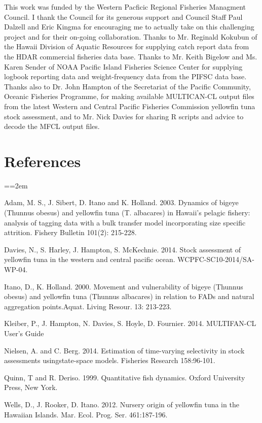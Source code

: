 \documentclass[12pt,letterpaper]{article}
\newcommand\doublespacing{\baselineskip=1.6\normalbaselineskip}
\begin{document}
\vspace{4ex}
This work was funded by the Western Pacficic Regional Fisheries
Managment Council. I thank the Council for its generous support and
Council Staff Paul Dalzell and Eric Kingma for encouraging me to
actually take on this challenging project and for their on-going
collaboration.
Thanks to Mr. Reginald Kokubun of the Hawaii Division of Aquatic
Resources for supplying catch report data from the HDAR commercial
fisheries data base.
Thanks to Mr. Keith Bigelow and Ms. Karen Sender of NOAA Pacific
Island Fisheries Science Center for supplying logbook reporting data and
weight-frequency data from the PIFSC data base.
Thanks also to Dr. John Hampton of the Secretariat of the Pacific
Community, Oceanic Fisheries Programme, for making available
MULTICAN-CL output files from the latest Western and Central Pacific
Fisheries Commission yellowfin tuna stock assessment, and to Mr. Nick
Davies for sharing R scripts and advice to decode the MFCL output files.

\section*{References}
{\parindent=0cm \small
\everypar={\hangindent=2em }\par
\doublespacing
Adam, M. S., J. Sibert, D. Itano and K. Holland. 2003. Dynamics of
bigeye (Thunnus obesus) and yellowfin tuna (T. albacares) in Hawaii's
pelagic fishery: analysis of tagging data with a bulk transfer model
incorporating size specific attrition. Fishery Bulletin 101(2):
215-228.

Davies, N., S. Harley, J. Hampton, S. McKechnie. 2014. Stock
assessment of yellowfin tuna in the western and central pacific ocean.
WCPFC-SC10-2014/SA-WP-04.

Itano, D., K. Holland. 2000.  Movement and vulnerability of bigeye
(Thunnus obesus) and yellowfin tuna (Thunnus albacares) in relation to
FADs and natural aggregation points.Aquat. Living Resour. 13: 213-223.

Kleiber, P., J. Hampton, N. Davies, S. Hoyle, D. Fournier. 2014.
MULTIFAN-CL User’s Guide

Nielsen, A. and C. Berg. 2014. Estimation of time-varying selectivity
in stock assessments usingstate-space models. Fisheries Research
158:96-101.

Quinn, T and R. Deriso. 1999. Quantitative fish dynamics. Oxford
University Press, New York.

Wells, D., J. Rooker, D. Itano. 2012.  Nursery origin of yellowfin
tuna in the Hawaiian Islands. Mar. Ecol. Prog. Ser. 461:187-196. 
\par}

\end{document}
